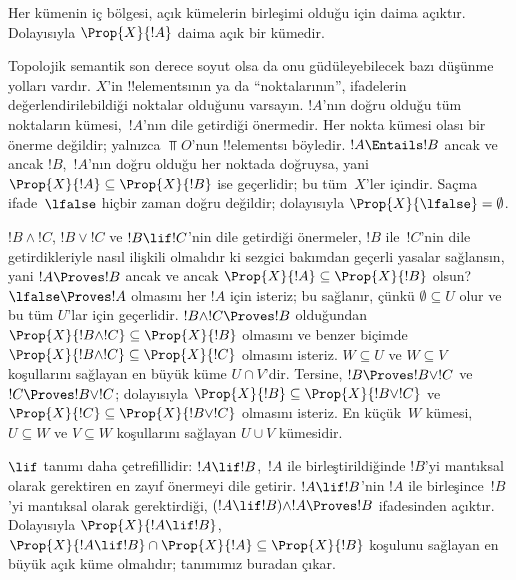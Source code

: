 Her kümenin iç bölgesi, açık kümelerin birleşimi olduğu için daima açıktır.
Dolayısıyla $\Prop{X}{!A}$ daima açık bir kümedir.

Topolojik semantik son derece soyut olsa da onu güdüleyebilecek bazı düşünme
yolları vardır. $X$'in !!{element}s{}ının ya da ``noktalarının'', ifadelerin
değerlendirilebildiği noktalar olduğunu varsayın. $!A$'nın doğru olduğu tüm
noktaların kümesi,~$!A$'nın dile getirdiği önermedir. Her nokta kümesi olası
bir önerme değildir; yalnızca $\Top{O}$'nun !!{element}s{}ı böyledir. $!A
\Entails !B$ ancak ve ancak $!B$,~$!A$'nın doğru olduğu her noktada doğruysa,
yani $\Prop{X}{!A} \subseteq \Prop{X}{!B}$ ise geçerlidir; bu tüm~$X$'ler
içindir.
Saçma ifade~$\lfalse$ hiçbir zaman doğru değildir; dolayısıyla
$\Prop{X}{\lfalse} = \emptyset$.

$!B \land !C$, $!B \lor !C$ ve $!B \lif !C$'nin dile getirdiği önermeler,
$!B$ ile~$!C$'nin dile getirdikleriyle nasıl ilişkili olmalıdır ki sezgici
bakımdan geçerli yasalar sağlansın, yani $!A \Proves !B$ ancak ve ancak
$\Prop{X}{!A} \subseteq \Prop{X}{!B}$ olsun? $\lfalse \Proves !A$ olmasını
her $!A$ için isteriz; bu sağlanır, çünkü $\emptyset \subseteq U$ olur ve bu
tüm $U$'lar için geçerlidir. $!B \land !C \Proves !B$ olduğundan $\Prop{X}{!B \land !C}
\subseteq \Prop{X}{!B}$ olmasını ve benzer biçimde $\Prop{X}{!B \land !C}
\subseteq \Prop{X}{!C}$ olmasını isteriz. $W \subseteq U$ ve $W \subseteq V$
koşullarını sağlayan en büyük küme $U \cap V$'dir. Tersine, $!B \Proves !B
\lor !C$ ve $!C \Proves !B \lor !C$; dolayısıyla $\Prop{X}{!B} \subseteq
\Prop{X}{!B \lor !C}$ ve $\Prop{X}{!C} \subseteq \Prop{X}{!B \lor !C}$
olmasını isteriz. En küçük~$W$ kümesi, $U \subseteq W$ ve $V \subseteq W$
koşullarını sağlayan $U \cup V$ kümesidir.

$\lif$ tanımı daha çetrefillidir: $!A \lif !B$,~$!A$ ile birleştirildiğinde
$!B$'yi mantıksal olarak gerektiren en zayıf önermeyi dile getirir. $!A \lif
!B$'nin $!A$ ile birleşince~$!B$'yi mantıksal olarak gerektirdiği, $(!A \lif
!B) \land !A \Proves !B $ ifadesinden açıktır. Dolayısıyla $\Prop{X}{!A \lif
!B}$, $\Prop{X}{!A \lif !B} \cap \Prop{X}{!A} \subseteq \Prop{X}{!B}$
koşulunu sağlayan en büyük açık küme olmalıdır; tanımımız buradan çıkar.

